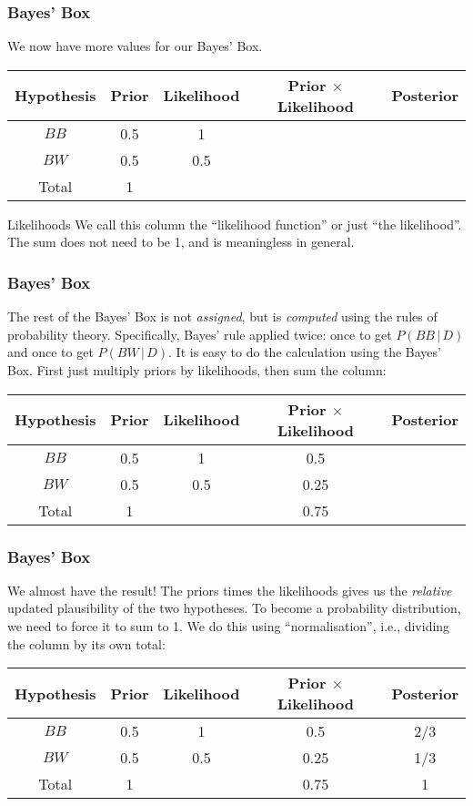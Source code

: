 \documentclass{beamer}
\newcommand{\given}{\,|\,}
\begin{document}
\begin{frame}
\frametitle{Bayes' Box}
We now have more values for our Bayes' Box.\\[0.5em]\pause
\begin{tabular}{|c|c|c|c|c|}
\hline
Hypothesis & Prior & Likelihood & Prior $\times$ Likelihood & Posterior \\
\hline
$BB$ & 0.5 & 1 & & \\
$BW$ & 0.5 & 0.5 & & \\
\hline
Total & 1 & & & \\
\hline
\end{tabular}\pause

\begin{alertblock}{Likelihoods}
We call this column the ``likelihood function'' or just ``the likelihood''.
The sum does not need to be 1, and is meaningless in
general.
\end{alertblock}

\end{frame}


\begin{frame}
\frametitle{Bayes' Box}
The rest of the Bayes' Box is not {\em assigned}, but is {\em computed}
using the rules of probability theory. Specifically, Bayes' rule applied
twice: once to get $P(BB \given D)$ and once to get $P(BW \given D)$.
It is easy to do the calculation using the Bayes' Box. First just multiply
priors by likelihoods, then sum the column:
\\[0.5em]\pause
\begin{tabular}{|c|c|c|c|c|}
\hline
Hypothesis & Prior & Likelihood & Prior $\times$ Likelihood & Posterior \\
\hline
$BB$ & 0.5 & 1 & 0.5 & \\
$BW$ & 0.5 & 0.5 & 0.25 & \\
\hline
Total & 1 & & 0.75 & \\
\hline
\end{tabular}\pause



\end{frame}


\begin{frame}
\frametitle{Bayes' Box}
We almost have the result! The priors times the likelihoods gives us the
{\em relative} updated plausibility of the two hypotheses. To become a
probability distribution, we need to force it to sum to 1. We do this
using ``normalisation'', i.e., dividing the column by its own total:\\[0.5em]\pause
\begin{tabular}{|c|c|c|c|c|}
\hline
Hypothesis & Prior & Likelihood & Prior $\times$ Likelihood & Posterior \\
\hline
$BB$ & 0.5 & 1 & 0.5 & 2/3 \\
$BW$ & 0.5 & 0.5 & 0.25 & 1/3 \\
\hline
Total & 1 & & 0.75 & 1\\
\hline
\end{tabular}\pause



\end{frame}
\end{document}
